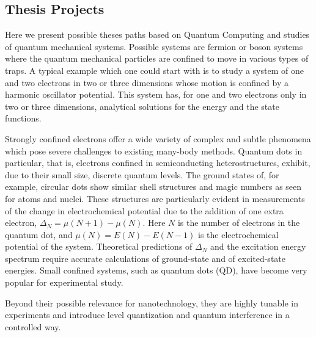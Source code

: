\documentclass[%
oneside,                 %
final,                   %
10pt]{article}
\begin{document}
\subsection*{Thesis Projects}

Here we present possible theses paths based on Quantum Computing  and
studies of quantum mechanical systems.  Possible systems are fermion
or boson systems where the quantum mechanical particles are confined
to move in various types of traps. A typical example which one could
start with is to study a system of one and two electrons in two or three
dimensions whose motion is confined by a harmonic  oscillator potential. This
system has, for one and two electrons only in two or three dimensions,
analytical solutions for the energy and the state
functions. 


Strongly confined electrons offer a wide variety of complex and subtle
phenomena which pose severe challenges to existing many-body methods.
Quantum dots in particular, that is, electrons confined in
semiconducting heterostructures, exhibit, due to their small size,
discrete quantum levels.  The ground states of, for example, circular
dots show similar shell structures and magic numbers as seen for atoms
and nuclei. These structures are particularly evident in measurements
of the change in electrochemical potential due to the addition of one
extra electron, $\Delta_N=\mu(N+1)-\mu(N)$. Here $N$ is the number of
electrons in the quantum dot, and $\mu(N)=E(N)-E(N-1)$ is the
electrochemical potential of the system.  Theoretical predictions of
$\Delta_N$ and the excitation energy spectrum require accurate
calculations of ground-state and of excited-state energies.  Small
confined systems, such as quantum dots (QD), have become very popular
for experimental study. 

Beyond their possible relevance for
nanotechnology, they are highly tunable in experiments and introduce
level quantization and quantum interference in a controlled way. 
\end{document}
